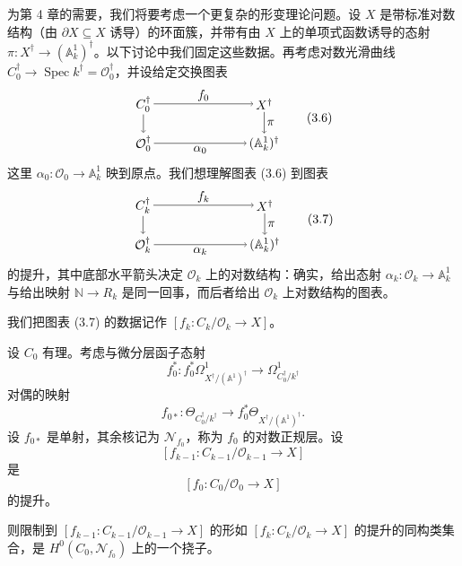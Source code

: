为第 4 章的需要，我们将要考虑一个更复杂的形变理论问题。设 $X$ 是带标准对数结构（由 $\partial X\subseteq X$ 诱导）的环面簇，并带有由 $X$ 上的单项式函数诱导的态射 $\pi:X^{\dagger}\to(\mathbb{A}^1_k)^{\dagger}$。以下讨论中我们固定这些数据。再考虑对数光滑曲线 $C_0^{\dagger}\to\operatorname{Spec} k^{\dagger}=\mathcal{O}_0^{\dagger}$，并设给定交换图表
\begin{equation}
\begin{tikzpicture}[baseline=(current bounding box.center), every node/.style={inner sep=2pt}]
  \node (A) at (0,1.1) {$C_0^{\dagger}$};
  \node (B) at (3.4,1.1) {$X^{\dagger}$};
  \node (C) at (0,0) {$\mathcal{O}_0^{\dagger}$};
  \node (D) at (3.4,0) {$(\mathbb{A}^1_k)^{\dagger}$};
  \draw[->] (A) -- node[above] {$f_0$} (B);
  \draw[->] (A) -- (C);
  \draw[->] (B) -- node[right] {$\pi$} (D);
  \draw[->] (C) -- node[below] {$\alpha_0$} (D);
\end{tikzpicture} \tag{3.6}
\end{equation}
这里 $\alpha_0:\mathcal{O}_0\to\mathbb{A}^1_k$ 映到原点。我们想理解图表 (3.6) 到图表
\begin{equation}
\begin{tikzpicture}[baseline=(current bounding box.center), every node/.style={inner sep=2pt}]
  \node (A) at (0,1.1) {$C_k^{\dagger}$};
  \node (B) at (3.4,1.1) {$X^{\dagger}$};
  \node (C) at (0,0) {$\mathcal{O}_k^{\dagger}$};
  \node (D) at (3.4,0) {$(\mathbb{A}^1_k)^{\dagger}$};
  \draw[->] (A) -- node[above] {$f_k$} (B);
  \draw[->] (A) -- (C);
  \draw[->] (B) -- node[right] {$\pi$} (D);
  \draw[->] (C) -- node[below] {$\alpha_k$} (D);
\end{tikzpicture} \tag{3.7}
\end{equation}
的提升，其中底部水平箭头决定 $\mathcal{O}_k$ 上的对数结构：确实，给出态射 $\alpha_k:\mathcal{O}_k\to\mathbb{A}^1_k$ 与给出映射 $\mathbb{N}\to R_k$ 是同一回事，而后者给出 $\mathcal{O}_k$ 上对数结构的图表。


我们把图表 (3.7) 的数据记作 $[f_k:C_k/\mathcal{O}_k\to X]$。

\begin{theorem}
设 $C_0$ 有理。考虑与微分层函子态射
\[
  f_0^{*}:f_0^{*}\Omega^1_{X^{\dagger}/(\mathbb{A}^1)^{\dagger}}\to\Omega^1_{C_0^{\dagger}/k^{\dagger}}
\]
对偶的映射
\[
  f_{0*}:\Theta_{C_0^{\dagger}/k^{\dagger}}\to f_0^{*}\Theta_{X^{\dagger}/(\mathbb{A}^1)^{\dagger}}.
\]
设 $f_{0*}$ 是单射，其余核记为 $\mathcal{N}_{f_0}$，称为 $f_0$ 的对数正规层。设
\[
  [f_{k-1}:C_{k-1}/\mathcal{O}_{k-1}\to X]
\]
是
\[
  [f_0:C_0/\mathcal{O}_0\to X]
\]
的提升。

则限制到 $[f_{k-1}:C_{k-1}/\mathcal{O}_{k-1}\to X]$ 的形如 $[f_k:C_k/\mathcal{O}_k\to X]$ 的提升的同构类集合，是 $H^0(C_0,\mathcal{N}_{f_0})$ 上的一个挠子。
\end{theorem}

